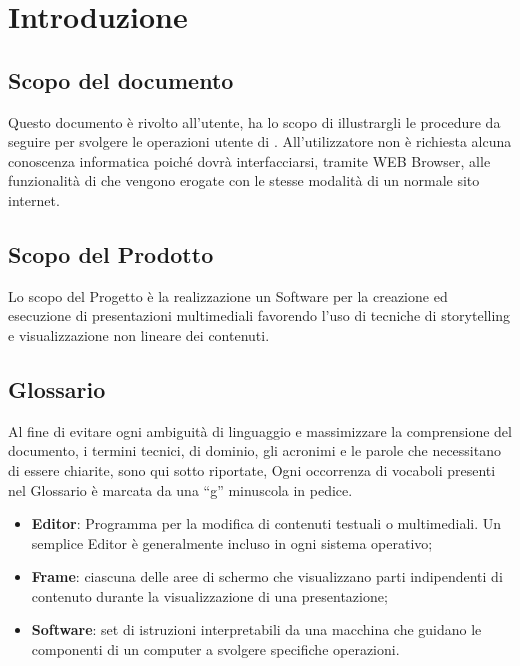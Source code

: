 \section{Introduzione}
\subsection{Scopo del documento}
Questo documento è rivolto all’utente, ha lo scopo di illustrargli le procedure da seguire per svolgere le operazioni utente di \premi . All'utilizzatore non è richiesta alcuna conoscenza informatica poiché dovrà interfacciarsi, tramite WEB Browser, alle funzionalità di \premi che vengono erogate con le stesse modalità di un normale sito internet.
\subsection{Scopo del Prodotto}
Lo scopo del Progetto è la realizzazione un Software per la creazione ed esecuzione di presentazioni multimediali favorendo l’uso di tecniche di storytelling e visualizzazione non lineare dei contenuti.
\subsection{Glossario}
Al fine di evitare ogni ambiguità di linguaggio e massimizzare la comprensione del documento, i termini tecnici, di dominio, gli acronimi e le parole che necessitano di essere chiarite, sono qui sotto riportate, Ogni occorrenza di vocaboli presenti nel Glossario è marcata da una “g” minuscola in pedice.
\begin{itemize}
\item \textbf{Editor}: Programma per la modifica di contenuti testuali o multimediali. Un semplice Editor è generalmente incluso in ogni sistema operativo;
\item \textbf{Frame}: ciascuna delle aree di schermo che visualizzano parti indipendenti di contenuto durante la visualizzazione di una presentazione;
\item \textbf{Software}: set di istruzioni interpretabili da una macchina che guidano le componenti di un computer a svolgere specifiche operazioni.

\end{itemize}



